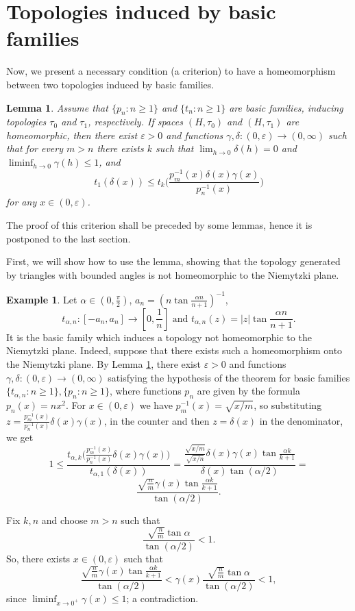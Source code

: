 \documentclass[a4paper,12pt,leqno]{amsart}
\renewcommand{\epsilon}{\varepsilon}
\newtheorem{lem}[thm]{Lemma}
\theoremstyle{definition}
\newtheorem{exm}{Example}
\renewcommand{\geq}{\geqslant}
\renewcommand{\leq}{\leqslant}
\begin{document}
\section{Topologies induced by basic families}
Now, we present a necessary condition (a criterion) to have a homeomorphism between two topologies induced by basic families.

\begin{lem}\label{thm:1}
  Assume that $\{p_n\colon n\geq 1\}$ and $\{t_n\colon n\geq 1\}$ are basic families, inducing topologies $\tau_0$ and $\tau_1$, respectively.
  If spaces $(H,\tau_0)$ and $(H,\tau_1)$ are homeomorphic, then there exist $\epsilon>0$ and functions $\gamma,\delta\colon (0,\epsilon)\to(0,\infty)$ such that for every  $m>n$ there exists  $k$ such that $\lim_{h\to 0}\delta(h)=0$ and $\liminf_{h\to0}\gamma(h)\leq 1$, and
  $$t_1(\delta(x))\leq t_k\bigg(\frac{p_m^{-1}(x)\delta(x)\gamma(x)}{p^{-1}_n(x)}\bigg)$$
  for any $x\in (0,\epsilon)$.
\end{lem}

The proof of this criterion shall be preceded by some lemmas, hence  it is  postponed to the last section.

First, we will show how to use the lemma, showing that the topology generated by triangles with bounded angles is not homeomorphic to the Niemytzki plane.


\begin{exm}\label{exm:3}
  Let $\alpha\in(0,\frac\pi2)$, $a_n=(n\tan\frac{\alpha n}{n+1})^{-1}$,
$$\textstyle t_{\alpha,n}\colon [-a_n,a_n]\to[0,\frac1n]\mbox{ and }t_{\alpha,n}(z)=|z|\tan\frac{\alpha n}{n+1}.$$
  It is the basic family which induces a topology not homeomorphic to the Niemytzki plane.
  Indeed, suppose that there exists such a homeomorphism onto the Niemytzki plane.
  By Lemma \ref{thm:1}, there exist $\epsilon>0$ and functions $\gamma,\delta\colon (0,\epsilon)\to(0,\infty)$ satisfying the hypothesis of the theorem for basic families $\{t_{\alpha,n}\colon n\geq 1\},\{p_n\colon n\geq1\}$, where functions $p_n$ are given by the formula $p_n(x)=nx^2$.
For $x\in(0,\epsilon)$ we have $p^{-1}_m(x)=\sqrt{x/m}$, so substituting $z=\frac{p_m^{-1}(x)}{p^{-1}_n(x)}\delta(x)\gamma(x)$, in the counter and then $z=\delta(x)$ in the denominator, we get
$$
1\leq\frac{t_{\alpha,k}\big(\frac{p_m^{-1}(x)}{p^{-1}_n(x)}\delta(x)\gamma(x)\big)}{t_{\alpha,1}(\delta(x))}=\frac{\frac{\sqrt{x/m}}{\sqrt{x/n}}\delta(x)\gamma(x)\tan\frac{\alpha k}{k+1}}{\delta(x)\tan(\alpha/2)}=$$
$$    \frac{\sqrt{\frac nm}\gamma(x)\tan\frac{\alpha k}{k+1}}{\tan(\alpha/2)}.$$

Fix $k,n$ and choose $m>n$ such that
$$    \frac{\sqrt{\frac nm}\tan\alpha}{\tan(\alpha/2)}<1.$$
So, there exists $x\in(0,\epsilon)$ such that
$$\frac{\sqrt{\frac nm}\gamma(x)\tan\frac{\alpha k}{k+1}}{\tan(\alpha/2)}<\gamma(x)
\frac{\sqrt{\frac nm}\tan\alpha}{\tan(\alpha/2)}<1,$$
since $\liminf_{x\to 0^+}\gamma(x)\leq 1$; a contradiction.
\end{exm}
\end{document}
